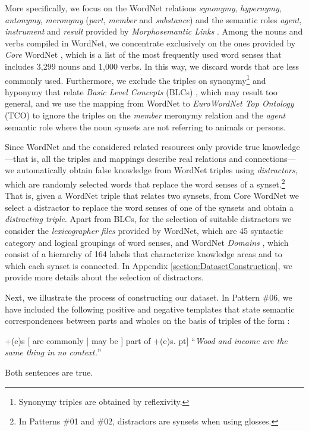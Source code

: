 \documentclass[11pt]{article}
\newcommand{\WORDNET}{WordNet}
\begin{document}
More specifically, we focus on the \WORDNET{} relations {\it synonymy}, {\it hypernymy}, {\it antonymy}, {\it meronymy} ({\it part}, {\it member} and {\it substance}) and the semantic roles {\it agent}, {\it instrument} and {\it result} provided by {\it Morphosemantic Links} \cite{FOC09}. Among the nouns and verbs compiled in \WORDNET{}, we concentrate exclusively on the ones provided by {\it Core} \WORDNET{} \cite{boydgraber2006adding}, which is a list of the most frequently used word senses that includes 3,299 nouns and 1,000 verbs. In this way, we discard words that are less commonly used. Furthermore, we exclude the triples on synonymy\footnote{Synonymy triples are obtained by reflexivity.} and hyponymy that relate {\it Basic Level Concepts} (BLCs) \cite{izquierdo2007exploring}, which may result too general, and we use the mapping from \WORDNET{} to {\it EuroWordNet Top Ontology} (TCO) to ignore the triples on the {\it member} meronymy relation and the {\it agent} semantic role where the noun synsets are not referring to animals or persons.

Since \WORDNET{} and the considered related resources only provide true knowledge ---that is, all the triples and mappings describe real relations and connections--- we automatically obtain false knowledge from \WORDNET{} triples using {\it distractors}, which are randomly selected words that replace the word senses of a synset.\footnote{In Patterns \#01 and \#02, distractors are synsets when using glosses.} That is, given a \WORDNET{} triple that relates two synsets, from Core \WORDNET{} we select a distractor to replace the word senses of one of the synsets and obtain a {\it distracting triple}. Apart from BLCs, for the selection of suitable distractors we consider the {\it lexicographer files} provided by \WORDNET{}, which are 45 syntactic category and logical groupings of word senses, and \WORDNET{} {\it Domains} \cite{bentivogli2004revising}, which consist of a hierarchy of 164 labels that characterize knowledge areas and to which each synset is connected. In Appendix \ref{section:DatasetConstruction}, we provide more details about the selection of distractors.

Next, we illustrate the process of constructing our dataset. In Pattern \#06, we have included the following positive and negative templates that state semantic correspondences between parts and wholes on the basis of triples of the form :
\begin{center}
+(e)s [ are commonly | may be ] part of +(e)s. \5pt]
``{\it Wood and income are the same thing in no context.}''
\end{center}
Both sentences are true.
\end{document}

